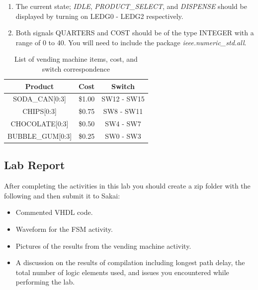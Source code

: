 \begin{enumerate}
	\item The current state; \emph{IDLE}, \emph{PRODUCT\_SELECT}, and \emph{DISPENSE} should be displayed by turning on LEDG0 - LEDG2 respectively.
	
	\item Both signals QUARTERS and COST should be of the type INTEGER with a range of 0 to 40. You will need to include the package \emph{ieee.numeric\_std.all}.

\end{enumerate}

\begin{table}[H]
	\centering
	\caption{List of vending machine items, cost, and switch correspondence}
	\begin{tabular}{ | c | c | c | }
		\hline                        
 		\bf Product & \bf Cost & \bf Switch\\ \hline
 		SODA\_CAN[0:3] & \$1.00 & SW12 - SW15 \\ \hline
		CHIPS[0:3] & \$0.75 & SW8 - SW11 \\ \hline
		CHOCOLATE[0:3] & \$0.50 & SW4 - SW7 \\ \hline
		BUBBLE\_GUM[0:3] & \$0.25 & SW0 - SW3 \\
 		\hline
	\end{tabular}
	\label{tab:costlist}
\end{table}


\subsection{Lab Report}

After completing the activities in this lab you should create a zip folder with the following and then submit it to Sakai:

\begin{itemize}
	\item Commented VHDL code.
	\item Waveform for the FSM activity.
	\item Pictures of the results from the vending machine activity.
	\item A discussion on the results of compilation including longest path delay, the total number of logic elements used, and issues you encountered while performing the lab.
\end{itemize}


